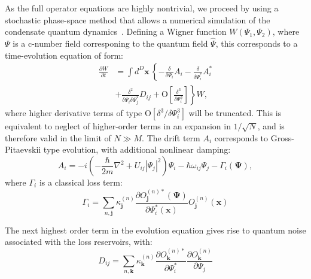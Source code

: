 \documentclass[aps,prl,twocolumn,showpacs,amsmath,amssymb,superscriptaddress]{revtex4-1}
\newcommand{\petersremark}[1]{\textcolor{cyan}{{[}PD: #1{]}}}
\newcommand{\xvec}{\boldsymbol{x}}
\newcommand{\jvec}{\boldsymbol{j}}
\newcommand{\kvec}{\boldsymbol{k}}
\newcommand{\Psivec}{\boldsymbol{\Psi}}
\begin{document}
As the full operator equations are highly nontrivial,
we proceed by using a stochastic phase-space method
that allows a numerical simulation of the condensate quantum dynamics~\cite{Drummond1993,Steel1998,Hoffmann2008}.
Defining a Wigner function $W\left(\Psi_{1},\Psi_{2}\right)$,
where $\Psi$ is a c-number field corresponing to the quantum field $\hat{\Psi}$,
this corresponds to a time-evolution equation of form:
\begin{equation}
\begin{split}
	\frac{\partial W}{\partial t} & = \int d^D \xvec \,\left\{
		-\frac{\delta}{\delta\Psi_{i}} A_{i} -
		\frac{\delta}{\delta\Psi_{i}^*} A_{i}^* \right. \\
& + \left. \frac{\delta^{2}}{\delta\Psi_{i} \delta\Psi_{j}^{*}}D_{ij} +
		\mbox{O} \left[ \frac{\delta^{3}}{\delta\Psi_{i}^{3}} \right]
	\right\} W,
\end{split}
\end{equation}
where higher derivative terms of type $\mbox{O}\left[\delta^3/\delta\Psi_{i}^{3}\right]$
will be truncated.
This is equivalent to neglect of higher-order terms in an expansion in $1/\sqrt{N}$,
and is therefore valid in the limit of $N \gg M$.
The drift term $A_{i}$ corresponds to Gross-Pitaevskii type evolution,
with additional nonlinear damping:
\begin{equation}
	A_{i} = -i \left(
	 	-\frac{\hbar}{2m} \nabla^{2} + U_{ij} \left| \Psi_{j} \right|^{2}
	\right) \Psi_{i} -
	\hbar \omega_{ij} \Psi_{j} -
	\Gamma_{i} \left( \Psivec \right),
\end{equation}
where $\Gamma_{i}$ is a classical loss term:
\begin{equation}
	\Gamma_{i} = \sum_{n,\jvec} \kappa_{\jvec}^{(n)}
	\frac{
		\partial O_{\jvec}^{(n)*} \left( \Psivec \right)
	}{
		\partial \Psi_{i}^* \left( \xvec \right)
	}
	O_{\jvec}^{(n)} \left( \xvec \right)
\end{equation}

The next highest order term in the evolution equation gives rise to
quantum noise associated with the loss reservoirs,
with:
\begin{equation}
	D_{ij} = \sum_{n,\kvec} \kappa_{\kvec}^{(n)}
	\frac{\partial O_{\kvec}^{(n)*}}{\partial\Psi_{i}^{*}}
	\frac{\partial O_{\kvec}^{(n)}}{\partial\Psi_{j}}
\end{equation}
\end{document}
